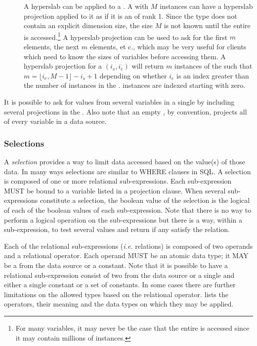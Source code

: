 \documentclass[justify]{nasa-ese}
\renewcommand{\Tableref}[2][here]{\texorhtml{Table~\ref{#2}}{\link{#1}{#2}}}
\renewcommand{\new}[1]{\emph{#1}}
\begin{document}
\begin{description}
\item[\Sequence] A hyperslab can be applied to a \Sequence. A
  \Sequence with $M$ instances can have a hyperslab projection applied
  to it as if it is an \Array of rank 1. Since the \Sequence type does
  not contain an explicit dimension size, the size $M$ is not known
  until the entire \Sequence is accessed.\footnote{For many \Sequence
    variables, it may never be the case that the entire \Sequence is
    accessed since it may contain millions of instances.} A hyperslab
  projection can be used to ask for the first $m$ elements, the next
  $m$ elements, et c., which may be very useful for clients which need
  to know the sizes of variables before accessing them. A hyperslab
  projection for a \Sequence $(i_{s}, i_{e})$ will return $m$
  instances of the \Sequence such that $m = \lfloor i_{e}, M-1 \rfloor
  - i_{s} + 1$ depending on whether $i_{e}$ is an index greater than
  the number of instances in the \Sequence. \Sequence instances are
  indexed starting with zero.
\end{description}

It is possible to ask for values from several variables in a single \CE by
including several projections in the \CE. Also note that an empty \CE, by
convention, projects all of every variable in a data source.

\subsubsection{Selections}
\label{sec-ce-selections}


A \new{selection} provides a way to limit data accessed based on the value(s)
of those data. In many ways selections are similar to WHERE clauses in
SQL\cite{date:DBMS}. A selection is composed of one or more relational
sub-expressions. Each sub-expression MUST be bound to a variable listed in a
projection clause. When several sub-expressions constitute a selection, the
boolean value of the selection is the logical  of each of the
boolean values of each sub-expression. Note that there is no way to perform a
logical  operation on the sub-expressions but there is a way, within
a sub-expression, to test several values and return  if any satisfy
the relation.

Each of the relational sub-expressions ({\it i.e.} relations) is
composed of two operands and a relational operator. Each operand MUST
be an atomic data type; it MAY be a \FQN from the data source or a
constant. Note that it is possible to have a relational sub-expression
consist of two \FQNs from the data source or a single \FQN and either
a single constant or a set of constants. In some cases there are
further limitations on the allowed types based on the relational
operator. \Tableref[Figure 5]{tab-ce-relations} lists the operators,
their meaning and the data types on which they may be applied.
\end{document}
